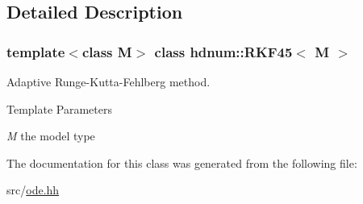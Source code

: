 \subsection{Detailed Description}
\subsubsection*{template$<$class M$>$ class hdnum::RKF45$<$ M $>$}

Adaptive Runge-\/Kutta-\/Fehlberg method. 
\begin{DoxyTemplParams}{Template Parameters}
\item[{\em M}]the model type \end{DoxyTemplParams}


The documentation for this class was generated from the following file:\begin{DoxyCompactItemize}
\item 
src/\hyperlink{ode_8hh}{ode.hh}\end{DoxyCompactItemize}
